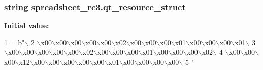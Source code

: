 \subsubsection[{qt\+\_\+resource\+\_\+struct}]{\setlength{\rightskip}{0pt plus 5cm}string spreadsheet\+\_\+rc3.\+qt\+\_\+resource\+\_\+struct}\label{namespacespreadsheet__rc3_adee2ea5b86af0627c8e914fc358b0c84}
{\bfseries Initial value\+:}
\begin{DoxyCode}
1 = b\textcolor{stringliteral}{"\(\backslash\)}
2 \textcolor{stringliteral}{\(\backslash\)x00\(\backslash\)x00\(\backslash\)x00\(\backslash\)x00\(\backslash\)x00\(\backslash\)x02\(\backslash\)x00\(\backslash\)x00\(\backslash\)x00\(\backslash\)x01\(\backslash\)x00\(\backslash\)x00\(\backslash\)x00\(\backslash\)x01\(\backslash\)}
3 \textcolor{stringliteral}{\(\backslash\)x00\(\backslash\)x00\(\backslash\)x00\(\backslash\)x00\(\backslash\)x00\(\backslash\)x02\(\backslash\)x00\(\backslash\)x00\(\backslash\)x00\(\backslash\)x01\(\backslash\)x00\(\backslash\)x00\(\backslash\)x00\(\backslash\)x02\(\backslash\)}
4 \textcolor{stringliteral}{\(\backslash\)x00\(\backslash\)x00\(\backslash\)x00\(\backslash\)x12\(\backslash\)x00\(\backslash\)x00\(\backslash\)x00\(\backslash\)x00\(\backslash\)x00\(\backslash\)x01\(\backslash\)x00\(\backslash\)x00\(\backslash\)x00\(\backslash\)x00\(\backslash\)}
5 \textcolor{stringliteral}{"}
\end{DoxyCode}
